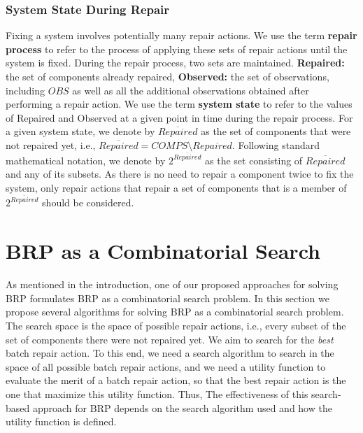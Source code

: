 \documentclass[a4paper,11pt]{report}
\newcommand\roni[1]{\textcolor{green}{roni: #1}}
\begin{document}
\subsection{System State During Repair}
\label{sec:sysStateDuring}
Fixing a system involves potentially many repair actions. We use the term {\bf repair process} to refer to the process of applying these sets of repair actions until the system is fixed.
During the repair process, two sets are maintained. 
{\bf Repaired:} the set of components already repaired, 
{\bf Observed:} the set of observations, including $OBS$ as well as all the additional observations obtained after performing a repair action. 
We use the term {\bf system state} to refer to the values of Repaired and Observed at a given point in time during the repair process. For a given system state, we denote by $\overline{Repaired}$ as the set of components that were not repaired yet, i.e., $\overline{Repaired} = COMPS \setminus Repaired$. Following standard mathematical notation, we denote by $2^{\overline{Repaired}}$ as the set consisting of $\overline{Repaired}$ and any of its subsets. As there is no need to repair a component twice to fix the system, only repair actions that repair a set of components that is a member of $2^{\overline{Repaired}}$ should be considered.

\chapter{BRP as a Combinatorial Search}
As mentioned in the introduction, one of our proposed approaches for solving BRP formulates BRP as a combinatorial search problem. In this section we propose several algorithms for solving BRP as a combinatorial search problem.
The search space is the space of possible repair actions, i.e., every subset of the set of components there were not repaired yet. We aim to search for the \emph{best} batch repair action. To this end, we need a search algorithm to search in the space of all possible batch repair actions, and we need a utility function to evaluate the merit of a batch repair action, so that the best repair action is the one that maximize this utility function. Thus, The effectiveness of this search-based approach for BRP depends on the search algorithm used and how the utility function is defined. 
\end{document}
